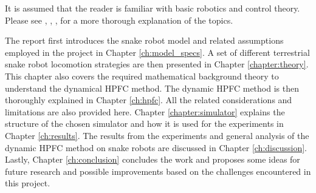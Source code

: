 It is assumed that the reader is familiar with basic robotics and control theory. Please see \cite{lynch2017modern}, \cite{lynch2017modernCompTorque}, \cite{waldron2016kinematics}, \cite{liljeback2012snake} for a more thorough explanation of the topics.

The report first introduces the snake robot model and related assumptions employed in the project in Chapter \ref{ch:model_specs}. A set of different terrestrial snake robot locomotion strategies are then presented in Chapter \ref{chapter:theory}. This chapter also covers the required mathematical background theory to understand the dynamical HPFC method. The dynamic HPFC method is then thoroughly explained in Chapter \ref{ch:hpfc}. All the related considerations and limitations are also provided here. Chapter \ref{chapter:simulator} explains the structure of the chosen simulator and how it is used for the experiments in Chapter \ref{ch:results}. The results from the experiments and general analysis of the dynamic HPFC method on snake robots are discussed in Chapter \ref{ch:discussion}. Lastly, Chapter \ref{ch:conclusion} concludes the work and proposes some ideas for future research and possible improvements based on the challenges encountered in this project.